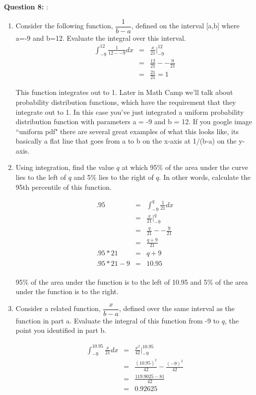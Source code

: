 \documentclass[12pt]{article}
\begin{document}
\bigskip


\noindent \textbf{Question 8:} :\\

\begin{enumerate}
	\item Consider the following function, $\dfrac{1}{b-a}$, defined on the interval [a,b] where a=-9 and b=12. Evaluate the integral over this interval.\\
	
	\begin{eqnarray*}
		\int_{-9}^{12} \frac{1}{12 - - 9} dx &=& \frac{x}{21} |_{-9}^{12}\\
		&=& \frac{12}{21} - -\frac{9}{21}\\
		&=& \frac{21}{21} = 1
	\end{eqnarray*}
	
	This function integrates out to 1. Later in Math Camp we'll talk about probability distribution functions, which have the requirement that they integrate out to 1. In this case you've just integrated a uniform probability distribution function with parameters a = -9 and b = 12. If you google image ``uniform pdf" there are several great examples of what this looks like, its basically a flat line that goes from a to b on the x-axis at 1/(b-a) on the y-axis. 
	
	\item Using integration, find the value $q$ at which 95\% of the area under the curve lies to the left of $q$ and 5\% lies to the right of $q$. In other words, calculate the 95th percentile of this function.
	
	\begin{eqnarray*}
		.95 &=& \int_{-9}^{q} \frac{1}{21}dx\\
		&=& \frac{x}{21} |_{-9}^{q} \\
		&=& \frac{q}{21} - - \frac{9}{21}\\
		&=& \frac{q+9}{21}\\
		.95*21 &=& q+9\\
		.95*21 - 9 &=& 10.95\\
	\end{eqnarray*}
	
	95\% of the area under the function is to the left of 10.95 and 5\% of the area under the function is to the right. 
	
	\item Consider a related function, $\dfrac{x}{b-a}$, defined over the same interval as the function in part a. Evaluate the integral of this function from -9 to $q$, the point you identified in part b. 
	
	\begin{eqnarray*}
		\int_{-9}^{10.95} \frac{x}{21} dx &=& \frac{x^2}{42} |_{-9}^{10.95}\\
		&=& \frac{(10.95)^2}{42} - \frac{(-9)^2}{42}\\
		&=& \frac{119.9025 - 81}{42}\\
		&=& 0.92625
	\end{eqnarray*}
\end{enumerate}
\end{document}
